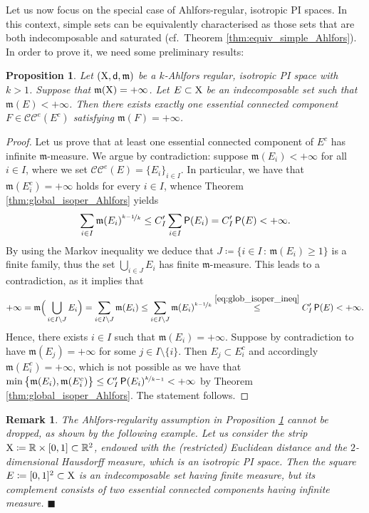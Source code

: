 \documentclass[reqno]{amsart}
\numberwithin{equation}{section}
\newcommand{\R}{\mathbb{R}}
\newcommand{\X}{{\rm X}}
\newcommand{\sfd}{{\sf d}}
\newcommand{\mm}{\mathfrak m}
\newcommand{\1}{\mathbbm 1}
\renewcommand{\P}{{\sf P}}
\newcommand{\CC}{\mathcal{CC}^e}
\newcommand{\fr}{\penalty-20\null\hfill\(\blacksquare\)}
\newtheorem{proposition}[theorem]{Proposition}
\newtheorem{remark}[theorem]{Remark}
\begin{document}
%
%
Let us now focus on the special case of Ahlfors-regular, isotropic PI spaces.
In this context, simple sets can be equivalently characterised as those sets
that are both indecomposable and saturated (cf.\ Theorem \ref{thm:equiv_simple_Ahlfors}).
In order to prove it, we need some preliminary results:
%
%
\begin{proposition}\label{prop:Ahlfors_one_inf}
Let \((\X,\sfd,\mm)\) be a \(k\)-Ahlfors regular, isotropic PI space
with \(k>1\). Suppose that \(\mm(\X)=+\infty\).
Let \(E\subset\X\) be an indecomposable set such that \(\mm(E)<+\infty\).
Then there exists exactly one essential connected component \(F\in\CC(E^c)\)
satisfying \(\mm(F)=+\infty\).
\end{proposition}
\begin{proof}
Let us prove that at least one essential connected component of \(E^c\)
has infinite \(\mm\)-measure. We argue by contradiction: suppose
\(\mm(E_i)<+\infty\) for all \(i\in I\), where we set \(\CC(E)=\{E_i\}_{i\in I}\).
In particular, we have that \(\mm(E_i^c)=+\infty\) holds for every \(i\in I\),
whence Theorem \ref{thm:global_isoper_Ahlfors} yields
\[
\sum_{i\in I}\mm(E_i)^{\nicefrac{k-1}{k}}\leq C'_I\sum_{i\in I}\P(E_i)=C'_I\,\P(E)<+\infty.
\]
By using the Markov inequality we deduce that
\(J\coloneqq\big\{i\in I\,:\,\mm(E_i)\geq 1\big\}\) is a finite family, thus
the set \(\bigcup_{i\in J}E_i\) has finite \(\mm\)-measure. This leads to a contradiction,
as it implies that
\[
+\infty=\mm\Big(\bigcup_{i\in I\setminus J}E_i\Big)=\sum_{i\in I\setminus J}\mm(E_i)
\leq\sum_{i\in I\setminus J}\mm(E_i)^{\nicefrac{k-1}{k}}
\overset{\eqref{eq:glob_isoper_ineq}}\leq C'_I\,\P(E)<+\infty.
\]
Hence, there exists \(i\in I\) such that \(\mm(E_i)=+\infty\).
Suppose by contradiction to have \(\mm(E_j)=+\infty\) for some \(j\in I\setminus\{i\}\).
Then \(E_j\subset E_i^c\) and accordingly \(\mm(E_i^c)=+\infty\), which is not possible as we
have that \(\min\big\{\mm(E_i),\mm(E_i^c)\big\}\leq C'_I\,\P(E_i)^{\nicefrac{k}{k-1}}<+\infty\)
by Theorem \ref{thm:global_isoper_Ahlfors}. The statement follows.
\end{proof}
%
%
\begin{remark}{\rm
The Ahlfors-regularity assumption in Proposition \ref{prop:Ahlfors_one_inf}
cannot be dropped, as shown by the following example. Let us consider the
strip \(\X\coloneqq\R\times[0,1]\subset\R^2\), endowed with the (restricted)
Euclidean distance and the \(2\)-dimensional Hausdorff measure, which is an
isotropic PI space. Then the square \(E\coloneqq[0,1]^2\subset\X\) is an
indecomposable set having finite measure, but its complement consists of
two essential connected components having infinite measure.
\fr}\end{remark}
\end{document}
